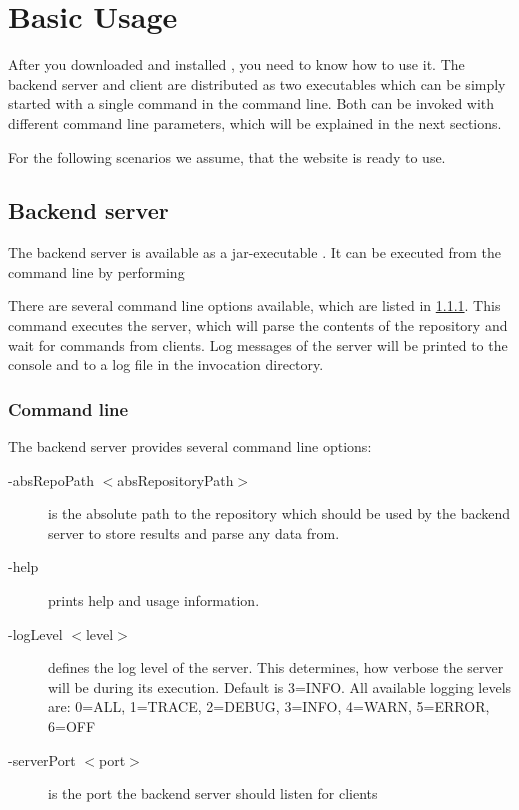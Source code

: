 
		 
	\section{Basic Usage}\label{sec_usage}
	After you downloaded and installed \clusteval, you need to know how to use it. The backend server and client are distributed as two executables which can be simply started with a single command in the command line. Both can be invoked with different command line parameters, which will be explained in the next sections.
	
	For the following scenarios we assume, that the website is ready to use.
	\subsection{Backend server}\label{usage_backend_server}
	The backend server is available as a jar-executable \highlight{\backendserver}. It can be executed from the command line by performing
	
	
	There are several command line options available, which are listed in \ref{backend_server_cli}. This command executes the server, which will parse the contents of the repository and wait for commands from clients. Log messages of the server will be printed to the console and to a log file in the invocation directory.
	\subsubsection{Command line}\label{backend_server_cli}
	The backend server provides several command line options:
	\begin{description}
	\item[-absRepoPath $<$absRepositoryPath$>$] is the absolute path to the repository which should be used by the backend server to store results and parse any data from.
	\item[-help] prints help and usage information.
	\item[-logLevel $<$level$>$] defines the log level of the server. This determines, how verbose the server will be during its execution. Default is 3=INFO. All available logging levels are: 0=ALL,
                                    1=TRACE, 2=DEBUG, 3=INFO, 4=WARN,
                                    5=ERROR, 6=OFF
	\item[-serverPort $<$port$>$] is the port the backend server should listen for clients
	\end{description}
	

